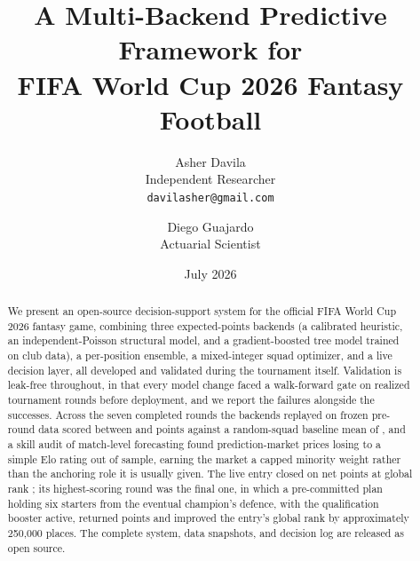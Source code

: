 \documentclass[11pt,a4paper]{article}
\title{A Multi-Backend Predictive Framework for\\
       FIFA World Cup 2026 Fantasy Football}
\author{Asher Davila\\
        \small Independent Researcher\\
        \small \texttt{davilasher@gmail.com}
        \and
        Diego Guajardo\\
        \small Actuarial Scientist}
\date{July 2026}
\begin{document}
\maketitle

\begin{abstract}
We present an open-source decision-support system for the official FIFA
World Cup 2026 fantasy game, combining three expected-points backends
(a calibrated heuristic, an independent-Poisson structural model, and a
gradient-boosted tree model trained on club data), a per-position
ensemble, a mixed-integer squad optimizer, and a live decision layer,
all developed and validated during the tournament itself. Validation
is leak-free throughout, in that every model change faced a
walk-forward gate on realized tournament rounds before deployment,
and we report the failures alongside the successes. Across the seven completed rounds
the backends replayed on frozen pre-round data scored between
\TotalPoisson{} and \TotalGbm{} points against a random-squad
baseline mean of \TotalRandomBaselineMean{}, and a skill audit of
match-level forecasting found prediction-market prices losing to a
simple Elo rating out of sample, earning the market a capped minority
weight rather than the anchoring role it is usually given. The live
entry closed on \TotalUserActualNet{} net points at global rank
\GlobalRankFinal{}; its highest-scoring round was the final one, in
which a pre-committed plan holding six starters from the eventual
champion's defence, with the qualification booster active, returned
\FinalRoundNet{} points and improved the entry's global rank by
approximately 250{,}000 places. The complete system, data snapshots,
and decision log are released as open source.
\end{abstract}


















\appendix


\end{document}
